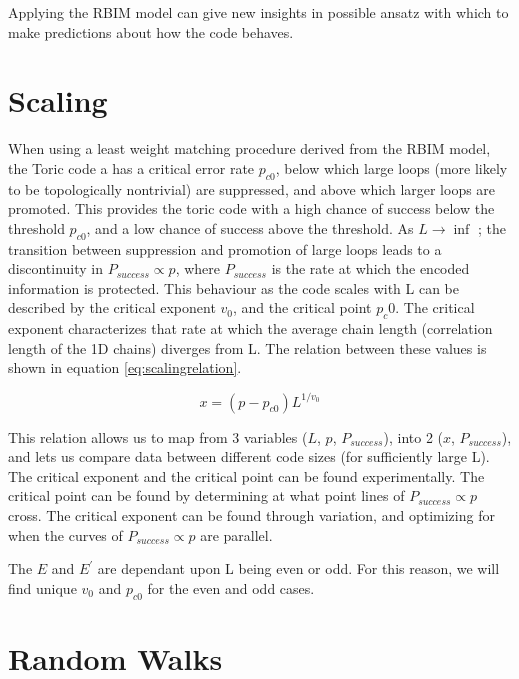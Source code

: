 	Applying the RBIM model can give new insights in possible ansatz with which to make predictions about how the code behaves. 

\section{Scaling}
	When using a least weight matching procedure derived from the RBIM model, the Toric code a has a critical error rate $p_{c0}$, below which large loops (more likely to be topologically nontrivial) are suppressed, and above which larger loops are promoted. This provides the toric code with a high chance of success below the threshold $p_{c0}$, and a low chance of success above the threshold. As $L\rightarrow \inf$ ; the transition between suppression and promotion of large loops leads to a discontinuity in $P_{success} \propto p$, where $P_{success}$ is the rate at which the encoded information is protected. This behaviour as the code scales with L can be described by the critical exponent $v_0$, and the critical point $p_c0$. The critical exponent characterizes that rate at which the average chain length (correlation length of the 1D chains) diverges from L. The relation between these values is shown in equation \ref{eq:scalingrelation}.
	
	\begin{equation}
	 x = (p-p_{c0})L^{1/v_0} 
	 \label{eq:scalingrelation}
	\end{equation}

	This relation allows us to map from 3 variables ($L$, $p$, $P_{success}$), into 2 ($x$, $P_{success}$), and lets us compare data between different code sizes (for sufficiently large L). The critical exponent and the critical point can be found experimentally. The critical point can be found by determining at what point lines of $P_{success} \propto p$ cross. The critical exponent can be found through variation, and optimizing for when the curves of $P_{success} \propto p$ are parallel. 

	The $E$ and $E^\prime$ are dependant upon L being even or odd. For this reason, we will find unique $v_0$ and $p_{c0}$ for the even and odd cases.
\section{Random Walks}
